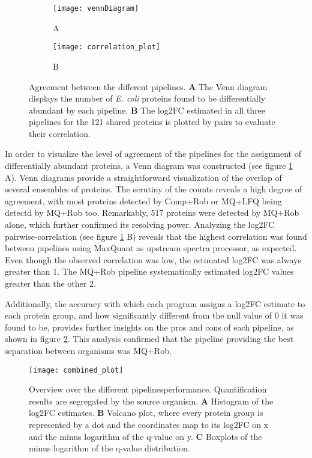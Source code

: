 \begin{figure}[H]
\centering
\begin{subfigure}{.40\textwidth}
\caption*{A}
\texttt{[image: vennDiagram]}
\end{subfigure}
\begin{subfigure}{.52\textwidth}
\caption*{B}
\texttt{[image: correlation\_plot]}
\end{subfigure}
\caption[Pipeline agreement plots]{Agreement between the different pipelines. \textbf{A} The Venn diagram displays the number of \textit{E. coli} proteins found to be differentially abundant by each pipeline. \textbf{B} The log2FC estimated in all three pipelines for the 121 shared proteins is plotted by pairs to evaluate their correlation.}
\label{fig:venn_cor}
\end{figure}


In order to visualize the level of agreement of the pipelines for the assignment of differentially abundant proteins, a Venn diagram was constructed (see figure \ref{fig:venn_cor} A). Venn diagrams provide a straightforward visualization of the overlap of several ensembles of proteins. The scrutiny of the counts reveals a high degree of agreement, with most proteins detected by Comp+Rob or MQ+LFQ being detectd by MQ+Rob too. Remarkably, 517 proteins were detected by MQ+Rob alone, which further confirmed its resolving power. Analyzing the log2FC pairwise-correlation (see figure \ref{fig:venn_cor} B) reveals that the highest correlation was found between pipelines using MaxQuant as upstream spectra processor, as expected. Even though the observed correlation was low, the estimated log2FC was always greater than 1. The MQ+Rob pipeline systematically estimated \ac{log2FC} values greater than the other 2.


Additionally, the accuracy with which each program assigns a \ac{log2FC} estimate to each protein group, and how significantly different from the null value of 0 it was found to be, provides further insights on the pros and cons of each pipeline, as shown in figure \ref{fig:combined_plot}. This analysis confirmed that the pipeline providing the best separation between organisms was MQ+Rob.




\begin{figure}[H]
\centering
\texttt{[image: combined\_plot]}
\caption[Pipelines performance]{Overview over the different pipelines\textquotesingle performance. Quantification results are segregated by the source organism. \textbf{A} Histogram of the \ac{log2FC} estimates. \textbf{B} Volcano plot, where every protein group is represented by a dot and the coordinates map to its \ac{log2FC} on x and the minus logarithm of the q-value on y. \textbf{C} Boxplots of the minus logarithm of the q-value distribution.}
\label{fig:combined_plot}
\end{figure}



